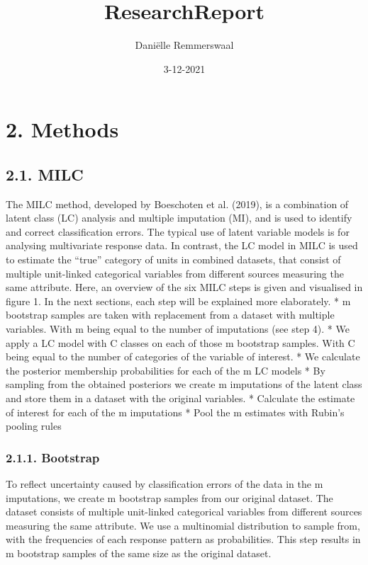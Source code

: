 \documentclass[
]{article}
\title{ResearchReport}
\author{Daniëlle Remmerswaal}
\date{3-12-2021}
\begin{document}
\maketitle

{
\setcounter{tocdepth}{2}
\tableofcontents
}
\hypertarget{methods}{%
\section{2. Methods}\label{methods}}

\hypertarget{milc}{%
\subsection{2.1. MILC}\label{milc}}

The MILC method, developed by Boeschoten et al. (2019), is a combination
of latent class (LC) analysis and multiple imputation (MI), and is used
to identify and correct classification errors. The typical use of latent
variable models is for analysing multivariate response data. In
contrast, the LC model in MILC is used to estimate the ``true'' category
of units in combined datasets, that consist of multiple unit-linked
categorical variables from different sources measuring the same
attribute. Here, an overview of the six MILC steps is given and
visualised in figure 1. In the next sections, each step will be
explained more elaborately. * m bootstrap samples are taken with
replacement from a dataset with multiple variables. With m being equal
to the number of imputations (see step 4). * We apply a LC model with C
classes on each of those m bootstrap samples. With C being equal to the
number of categories of the variable of interest. * We calculate the
posterior membership probabilities for each of the m LC models * By
sampling from the obtained posteriors we create m imputations of the
latent class and store them in a dataset with the original variables. *
Calculate the estimate of interest for each of the m imputations * Pool
the m estimates with Rubin's pooling rules

\hypertarget{bootstrap}{%
\subsubsection{2.1.1. Bootstrap}\label{bootstrap}}

To reflect uncertainty caused by classification errors of the data in
the m imputations, we create m bootstrap samples from our original
dataset. The dataset consists of multiple unit-linked categorical
variables from different sources measuring the same attribute. We use a
multinomial distribution to sample from, with the frequencies of each
response pattern as probabilities. This step results in m bootstrap
samples of the same size as the original dataset.
\end{document}

